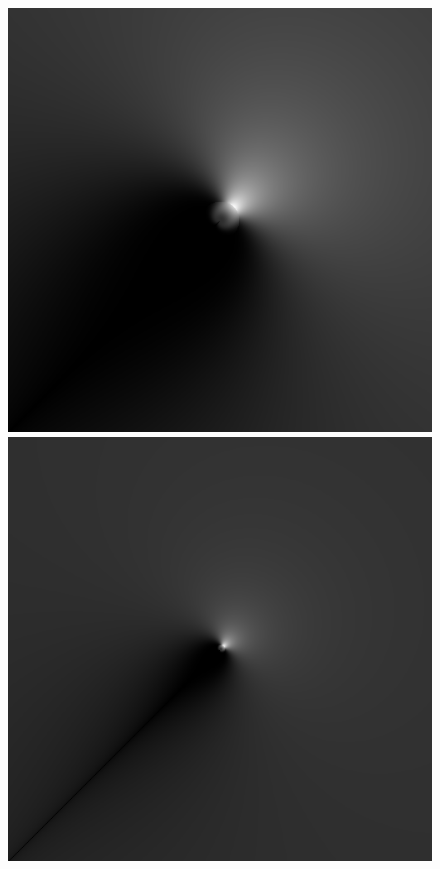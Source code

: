 \begin{figure}
{ }
 \subtop
 {
 \includegraphics[scale=0.25]{figures/mitsuyasu_dfilt_wur_sqrt2.png}
 }
 \hfill
 \subtop
 {
 \includegraphics[scale=0.25]{figures/mitsuyasu_dfilt_wur_sqrt8.png}
}
\end{figure}
